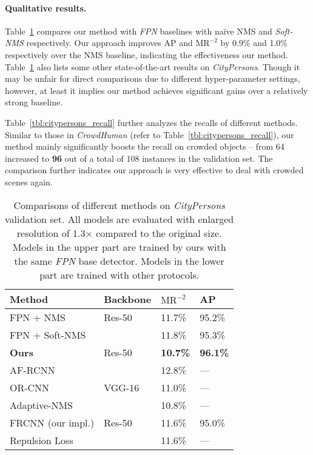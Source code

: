 \documentclass[10pt,twocolumn,letterpaper]{article}
\begin{document}
\paragraph{Qualitative results. }
Table~\ref{tbl:citypersons_eval} compares our method with \emph{FPN} baselines with na\"ive NMS and \emph{Soft-NMS} respectively. Our approach improves AP and $\text{MR}^{-2}$ by 0.9\% and 1.0\% respectively over the NMS baseline, indicating the effectiveness our method. Table~\ref{tbl:citypersons_eval} also lists some other state-of-the-art results on \emph{CityPersons}. Though it may be unfair for direct comparisons due to different hyper-parameter settings, however, at least it implies our method achieves significant gains over a relatively strong baseline. 

Table~\ref{tbl:citypersons_recall} further analyzes the recalls of different methods. Similar to those in \emph{CrowdHuman} (refer to Table~\ref{tbl:citypersons_recall}), our method mainly significantly boosts the recall on crowded objects -- from 64 increased to \textbf{96} out of a total of 108 instances in the validation set. The comparison further indicates our approach is very effective to deal with crowded scenes again. 
 
\begin{table}[!htbp]
   \centering
   \begin{tabular}{p{35mm}|p{13mm}<{\centering}|p{10mm}<{\centering}p{8mm}<{\centering}}
\toprule
   Method & Backbone & $\text{MR}^{-2}$ & AP \\
   \hline
   FPN + NMS & Res-50 & 11.7\% & 95.2\%  \\
   FPN + Soft-NMS \cite{softnms} &  & 11.8\% & 95.3\%  \\
   \hline
   \textbf{Ours}& Res-50 & \textbf{10.7\%} & \textbf{96.1\%}   \\
   \hline\hline
   AF-RCNN~\cite{zhang2017citypersons} &  & 12.8\% &---\\
   OR-CNN~\cite{zhang2018occlusion} & VGG-16 &11.0\% & ---\\
   Adaptive-NMS ~\cite{adaptiveNMS}  & &  10.8\% & ---  \\
   \hline
   FRCNN (our impl.) \cite{ren2015faster}  & Res-50 & 11.6\% & 95.0\% \\
   Repulsion Loss~\cite{repulseloss}&  & 11.6\% & --- \\
   \bottomrule
   \end{tabular}
   \caption{Comparisons of different methods on \emph{CityPersons} validation set. All models are evaluated with enlarged resolution of 1.3$\times$ compared to the original size. Models in the upper part are trained by ours with the same \emph{FPN} base detector. Models in the lower part are trained with other protocols. }
   \label{tbl:citypersons_eval}
\end{table}
\end{document}
